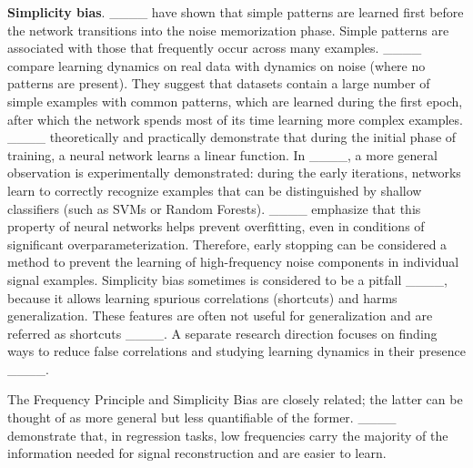 \textbf{Simplicity bias}. ____ have shown that simple patterns
are learned first before the network transitions into the noise memorization
phase. Simple patterns are associated with those that frequently occur across
many examples. ____ compare learning dynamics on real data
with dynamics on noise (where no patterns are present). They suggest that
datasets contain a large number of simple examples with common patterns, which
are learned during the first epoch, after which the network spends most of its
time learning more complex examples. ____ theoretically and
practically demonstrate that during the initial phase of training, a neural
network learns a linear function. In ____, a more general
observation is experimentally demonstrated: during the early iterations,
networks learn to correctly recognize examples that can be distinguished by
shallow classifiers (such as SVMs or Random Forests). ____
emphasize that this property of neural networks helps prevent overfitting, even
in conditions of significant overparameterization. Therefore, early stopping can
be considered a method to prevent the learning of high-frequency noise
components in individual signal examples. Simplicity bias sometimes is
considered to be a pitfall ____,
because it allows learning spurious correlations (shortcuts) and harms
generalization. These features are often not useful for generalization and are
referred as shortcuts ____. A separate
research direction focuses on finding ways to reduce false correlations and
studying learning dynamics in their presence ____.


The Frequency Principle and Simplicity Bias are closely related; the latter can
be thought of as more general but less quantifiable of the former. ____
demonstrate that, in regression tasks, low frequencies carry the majority of the
information needed for signal reconstruction and are easier to learn.



